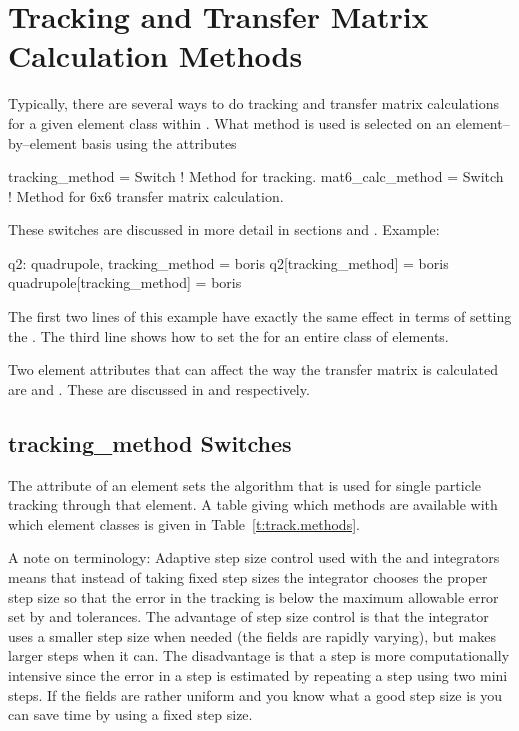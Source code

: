 \chapter{Tracking and Transfer Matrix Calculation Methods}
\label{c:methods}

Typically, there are several ways to do tracking and transfer matrix
calculations for a given element class within \bmad. What method is
used is selected on an element--by--element basis using the attributes
\begin{example}
  tracking_method = Switch   ! Method for tracking.
  mat6_calc_method = Switch  ! Method for 6x6 transfer matrix calculation.
\end{example}
These switches are discussed in more detail in sections  
and . Example:
\begin{example}
  q2: quadrupole, tracking_method = boris
  q2[tracking_method] = boris
  quadrupole[tracking_method] = boris
\end{example}
The first two lines of this example have exactly the same effect in
terms of setting the . The third line shows how to
set the  for an entire class of elements.

Two element attributes that can affect the way the transfer matrix is
calculated are  and . These are
discussed in  and  respectively.


\section{tracking_method Switches}
\label{s:tkm}

The  attribute of an element sets the algorithm that is
used for single particle tracking through that element.
A table giving which methods are available with which element classes is
given in Table~\ref{t:track.methods}.

A note on terminology: Adaptive step size control used with the
 and  integrators means that 
instead of taking fixed step sizes the integrator chooses the proper
step size so that the error in the tracking is below the maximum
allowable error set by  and  tolerances. The
advantage of step size control is that the integrator uses a smaller
step size when needed (the fields are rapidly varying), but makes
larger steps when it can. The disadvantage is that a step is more
computationally intensive since the error in a step is estimated by
repeating a step using two mini steps. If the fields are rather
uniform and you know what a good step size is you can save time by using
a fixed step size.

